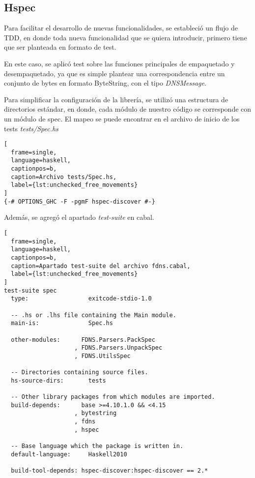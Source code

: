\documentclass[6pt]{article}
\begin{document}
\subsection{Hspec \cite{package-hspec}}

Para facilitar el desarrollo de nuevas funcionalidades, se estableció
un flujo de TDD, en donde toda nueva funcionalidad que se quiera
introducir, primero tiene que ser planteada en formato de test.

En este caso, se aplicó test sobre las funciones principales de
empaquetado y desempaquetado, ya que es simple plantear una
correspondencia entre un conjunto de bytes en formato ByteString, con
el tipo \textit{DNSMessage}.

Para simplificar la configuración de la librería, se utilizó una
estructura de directorios estándar, en donde, cada módulo de nuestro
código se corresponde con un módulo de spec. El mapeo se puede encontrar
en el archivo de inicio de los tests \textit{tests/Spec.hs}

\begin{lstlisting}[
  frame=single,
  language=haskell,
  captionpos=b,
  caption=Archivo tests/Spec.hs,
  label={lst:unchecked_free_movements}
]
{-# OPTIONS_GHC -F -pgmF hspec-discover #-}
\end{lstlisting}

Además, se agregó el apartado \textit{test-suite} en cabal.

\begin{lstlisting}[
  frame=single,
  language=haskell,
  captionpos=b,
  caption=Apartado test-suite del archivo fdns.cabal,
  label={lst:unchecked_free_movements}
]
test-suite spec
  type:                 exitcode-stdio-1.0

  -- .hs or .lhs file containing the Main module.
  main-is:              Spec.hs

  other-modules:      FDNS.Parsers.PackSpec
                    , FDNS.Parsers.UnpackSpec
                    , FDNS.UtilsSpec

  -- Directories containing source files.
  hs-source-dirs:       tests

  -- Other library packages from which modules are imported.
  build-depends:      base >=4.10.1.0 && <4.15
                    , bytestring
                    , fdns
                    , hspec

  -- Base language which the package is written in.
  default-language:     Haskell2010

  build-tool-depends: hspec-discover:hspec-discover == 2.*
\end{lstlisting}
\end{document}
